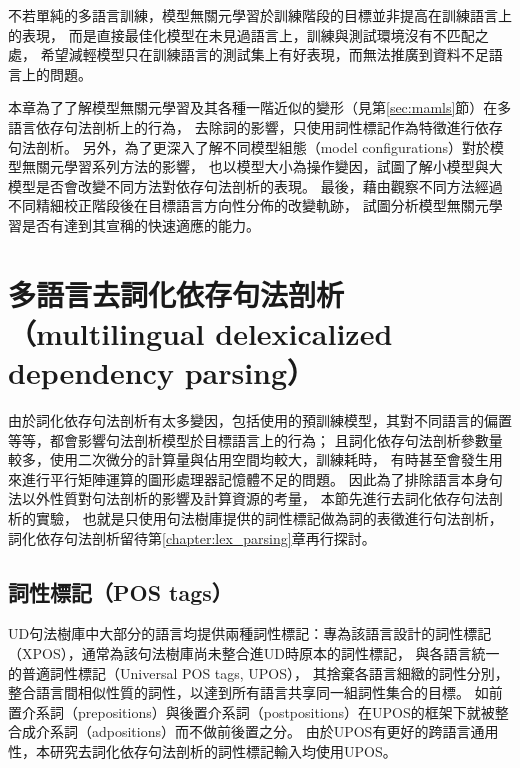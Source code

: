 不若單純的多語言訓練，模型無關元學習於訓練階段的目標並非提高在訓練語言上的表現，
而是直接最佳化模型在未見過語言上，訓練與測試環境沒有不匹配之處，
希望減輕模型只在訓練語言的測試集上有好表現，而無法推廣到資料不足語言上的問題。

本章為了了解模型無關元學習及其各種一階近似的變形（見第\ref{sec:mamls}節）在多語言依存句法剖析上的行為，
去除詞的影響，只使用詞性標記作為特徵進行依存句法剖析。
另外，為了更深入了解不同模型組態（model configurations）對於模型無關元學習系列方法的影響，
也以模型大小為操作變因，試圖了解小模型與大模型是否會改變不同方法對依存句法剖析的表現。
最後，藉由觀察不同方法經過不同精細校正階段後在目標語言方向性分佈的改變軌跡，
試圖分析模型無關元學習是否有達到其宣稱的快速適應的能力。
\iffalse
尤其當目標任務缺乏資料的時候，若使用過於有表現力的假說集合，
易使模型過擬合到目標任務上，
利用相似任務進行多工學習幫助目標任務提升表現的效果尤其顯著。
然而多工學習得到的模型可以在訓練過的所有任務上的測試集有好表現，
但並未保證這樣的好表現可以轉移到相似但未見過的任務上；
而芬氏(Chelsea Finn)提出的模型無關元學習(model-agnostic meta-learning)
\cite{Finn2017ModelAgnosticMF}提供了多工學習之外的另一種方法，
將領域的歸納偏置（inductive bias）注入類神經網路中。
\fi

\section{多語言去詞化依存句法剖析（multilingual delexicalized dependency parsing）}
由於詞化依存句法剖析有太多變因，包括使用的預訓練模型，其對不同語言的偏置等等，都會影響句法剖析模型於目標語言上的行為；
且詞化依存句法剖析參數量較多，使用二次微分的計算量與佔用空間均較大，訓練耗時，
有時甚至會發生用來進行平行矩陣運算的圖形處理器記憶體不足的問題。
因此為了排除語言本身句法以外性質對句法剖析的影響及計算資源的考量，
本節先進行去詞化依存句法剖析的實驗，
也就是只使用句法樹庫提供的詞性標記做為詞的表徵進行句法剖析，
詞化依存句法剖析留待第\ref{chapter:lex_parsing}章再行探討。

\subsection{詞性標記（POS tags）}
UD句法樹庫中大部分的語言均提供兩種詞性標記：專為該語言設計的詞性標記（XPOS），通常為該句法樹庫尚未整合進UD時原本的詞性標記，
與各語言統一的普適詞性標記\cite{petrov-etal-2012-universal}（Universal POS tags, UPOS），
其捨棄各語言細緻的詞性分別，
整合語言間相似性質的詞性，以達到所有語言共享同一組詞性集合的目標。
如前置介系詞（prepositions）與後置介系詞（postpositions）在UPOS的框架下就被整合成介系詞（adpositions）而不做前後置之分。
由於UPOS有更好的跨語言通用性，本研究去詞化依存句法剖析的詞性標記輸入均使用UPOS。

